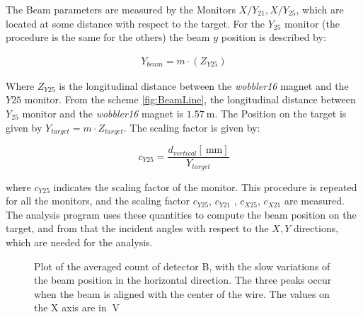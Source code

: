 The Beam parameters are measured by the Monitors $X/Y_{21}, X/Y_{25}$, which are located at some distance with respect to the target. For the $Y_{25}$ monitor (the procedure is the same for the others) the beam $y$ position is described by:

\begin{align*}
Y_{beam} = m \cdot (Z_{Y25})
\end{align*}

Where $Z_{Y25}$ is the longitudinal distance between the \textit{wobbler16} magnet and the $Y25$ monitor. From the scheme \ref{fig:BeamLine}, the longitudinal distance between $Y_{25}$ monitor and the \textit{wobbler16} magnet is $\SI{1.57}{\meter}$. The Position on the target is given by $Y_{target} = m \cdot Z_{target}$. The scaling factor is given by:

\begin{equation}
c_{Y25} = \dfrac{d_{vertical} [\SI{}{\milli \meter}]}{ Y_{target}} 
\end{equation}

where $c_{Y25}$ indicates the scaling factor of the monitor. This procedure is repeated for all the monitors, and the scaling factor $c_{Y25}$, $c_{Y21}$ , $c_{X25}$, $c_{X21}$ are measured. The analysis program uses these quantities to compute the beam position on the target, and from that the incident angles with respect to the $X,Y$ directions, which are needed for the analysis.

\begin{figure}[hbtp]
\centering
{}
\caption{Plot of the averaged count of detector B, with the slow variations of the beam position in the horizontal direction. The three peaks occur when the beam is aligned with the center of the wire. The values on the X axis are in $\SI{}{\volt}$}
\label{fig:HorizontalCalibration}
\end{figure}

